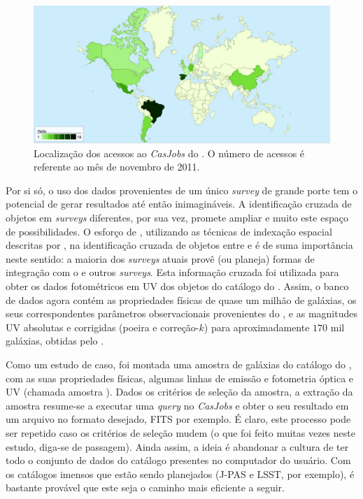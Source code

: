 \begin{figure}
	\includegraphics[width=\textwidth]{figuras/starlight-analytics.eps}
	\caption[Localização dos acessos ao {\em CasJobs} do \starlight.]
	{Localização dos acessos ao {\em CasJobs} do \starlight. O número de acessos é
	referente ao mês de novembro de 2011.}	
	\label{fig:AcessosStarlight}
\end{figure}

Por si só, o uso dos dados provenientes de um único {\em survey} de grande porte
tem o potencial de gerar resultados até então inimagináveis. A identificação
cruzada de objetos em {\em surveys} diferentes, por sua vez, promete ampliar e
muito este espaço de possibilidades. O esforço de \citet{Budavari2009},
utilizando as técnicas de indexação espacial descritas por \citet{Kunszt2001},
na identificação cruzada de objetos entre \SDSS e \galex é de suma importância
neste sentido: a maioria dos {\em surveys} atuais provê (ou planeja) formas de
integração com o \SDSS e outros {\em surveys}. Esta informação cruzada foi
utilizada para obter os dados fotométricos em UV dos objetos do catálogo do
\starlight. Assim, o banco de dados agora contém as propriedades físicas de
quase um milhão de galáxias, os seus correspondentes parâmetros observacionais
provenientes do \SDSS, e as magnitudes UV absolutas e corrigidas (poeira e
correção-$k$) para aproximadamente $170$ mil galáxias, obtidas pelo \galex.

Como um estudo de caso, foi montada uma amostra de galáxias do catálogo do
\starlight, com as suas propriedades físicas, algumas linhas de emissão e
fotometria óptica e UV (chamada amostra \starlightUV). Dados os critérios de
seleção da amostra, a extração da amostra resume-se a executar uma {\em query}
no {\em CasJobs} e obter o seu resultado em um arquivo no formato desejado, FITS
por exemplo. É claro, este processo pode ser repetido caso os critérios de
seleção mudem (o que foi feito muitas vezes neste estudo, diga-se de passagem).
Ainda assim, a ideia é abandonar a cultura de ter todo o conjunto de dados do
catálogo presentes no computador do usuário. Com os catálogos imensos que estão
sendo planejados (J-PAS e LSST, por exemplo), é bastante provável que este seja
o caminho mais eficiente a seguir.

